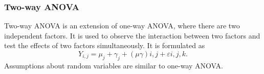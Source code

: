 \subsubsection{Two-way ANOVA}

Two-way ANOVA is an extension of one-way ANOVA, where there are two independent factors. It is used to observe the interaction between two factors and test the effects of two factors simultaneously. It is formulated as
\begin{equation}
 Y_{i,j}=\mu_j+\gamma_j+(\mu\gamma){i,j}+\varepsilon{i,j,k}.
\end{equation}
Assumptions about random variables are similar to one-way ANOVA.
